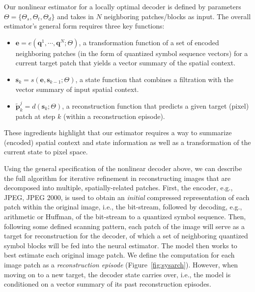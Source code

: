 \documentclass[smallabstract,smallcaptions]{dccpaper}
\begin{document}
Our nonlinear estimator for a locally optimal decoder is defined by parameters $\Theta = \{\Theta_s, \Theta_t, \Theta_d\}$ and takes in $N$ neighboring patches/blocks as input. The overall estimator's general form requires three key functions:
\begin{itemize}[noitemsep] %
\item $\mathbf{e} = e(\mathbf{q}^1, \cdots, \mathbf{q}^N ; \Theta)$, a transformation function of a set of encoded neighboring patches (in the form of quantized symbol sequence vectors) for a current target patch that yields a vector summary of the spatial context.
\item $\mathbf{s}_k = s(\mathbf{e}, \mathbf{s}_{k-1} ; \Theta)$, a state function that combines a filtration with the vector summary of input spatial context.
\item $\widetilde{\mathbf{p}}^j_k = d(\mathbf{s}_k ; \Theta)$, a reconstruction function that predicts a given target (pixel) patch at step $k$ (within a reconstruction episode).
\end{itemize}
These ingredients highlight that our estimator requires a way to summarize (encoded) spatial context and state information as well as a transformation of the current state to pixel space. %

Using the general specification of the nonlinear decoder above, we can describe the full algorithm for iterative refinement in reconstructing images that are decomposed into multiple, spatially-related patches. First, the encoder, e.g., JPEG, JPEG 2000, is used to obtain an \emph{initial} compressed representation of each patch within the original image, i.e., the bit-stream, followed by decoding, e.g., arithmetic or Huffman, of the bit-stream to a quantized symbol sequence. Then, following some defined scanning pattern, each patch of the image will serve as a target for reconstruction for the decoder, of which a set of neighboring quantized symbol blocks will be fed into the neural estimator. The model then works to best estimate each original image patch. We define the computation for each image patch as a \emph{reconstruction episode} (Figure~\ref{fig:sysarch}). However, when moving on to a new target, the decoder state carries over, i.e., the model is conditioned on a vector summary of its past reconstruction episodes. %
\end{document}
